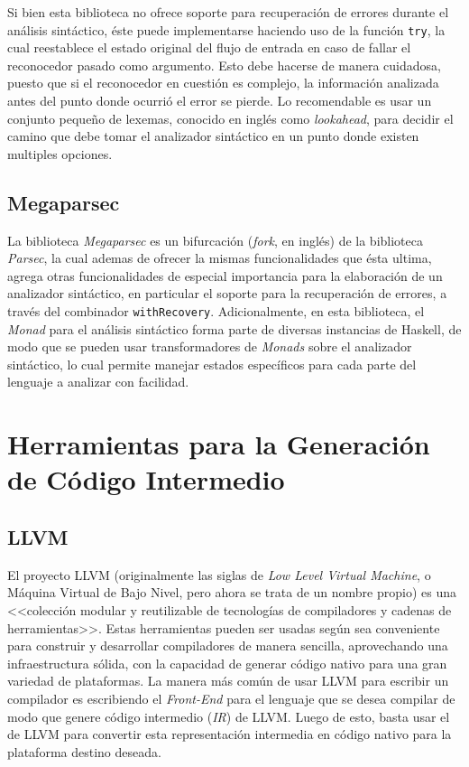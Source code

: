 Si bien esta biblioteca no ofrece soporte para recuperación de errores durante
el análisis sintáctico, éste puede implementarse haciendo uso de la función
\texttt{try}, la cual reestablece el estado original del flujo de entrada en
caso de fallar el reconocedor pasado como argumento. Esto debe hacerse de manera
cuidadosa, puesto que
 si
el reconocedor en cuestión es complejo, la información analizada antes del punto
donde ocurrió el error se pierde. Lo recomendable es usar un conjunto pequeño de
lexemas, conocido en inglés como \textit{lookahead}, para decidir el camino que
debe tomar el analizador sintáctico en un punto donde existen multiples
opciones.

\subsection{Megaparsec}

La biblioteca \textit{Megaparsec} es un bifurcación (\emph{fork}, en inglés) de
la biblioteca \textit{Parsec}, la cual ademas de ofrecer la mismas
funcionalidades que ésta ultima, agrega otras funcionalidades de especial
importancia para la elaboración de un analizador sintáctico, en particular el
soporte para la recuperación de errores, a través del combinador
\texttt{withRecovery}. Adicionalmente, en esta biblioteca, el \textit{Monad}
para el análisis sintáctico forma parte de diversas instancias de Haskell, de
modo que se pueden usar transformadores de \textit{Monads} sobre el analizador
sintáctico, lo cual permite manejar estados específicos para cada parte del
lenguaje a analizar con facilidad.


\section{Herramientas para la Generación de Código Intermedio}

\subsection{LLVM}

El proyecto LLVM (originalmente las siglas de \textit{Low Level Virtual
Machine}, o Máquina Virtual de Bajo Nivel, pero ahora se trata de un nombre
propio) es una <<colección modular y reutilizable de tecnologías de compiladores
y cadenas de herramientas>>. Estas herramientas pueden ser usadas según sea
conveniente para construir y desarrollar compiladores de manera sencilla,
aprovechando una infraestructura sólida, con la capacidad de generar código
nativo para una gran variedad de plataformas. La manera más común de usar LLVM
para escribir un compilador es escribiendo el \textit{Front-End} para el
lenguaje que se desea compilar de modo que genere código intermedio
(\textit{IR}) de LLVM. Luego de esto, basta usar el  de LLVM
para convertir esta representación intermedia en código nativo para la
plataforma destino deseada.

